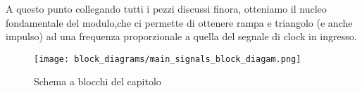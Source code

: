 A questo punto collegando tutti i pezzi discussi finora, otteniamo il nucleo fondamentale
del modulo,che ci permette di ottenere rampa e triangolo (e anche impulso) ad una frequenza
proporzionale a quella del segnale di clock in ingresso.
\medskip

\begin{figure}[ht]
    \centering
    \texttt{[image: block\_diagrams/main\_signals\_block\_diagam.png]}
    \caption{Schema a blocchi del capitolo}
    \label{main_signals_block_diagram}
\end{figure}

